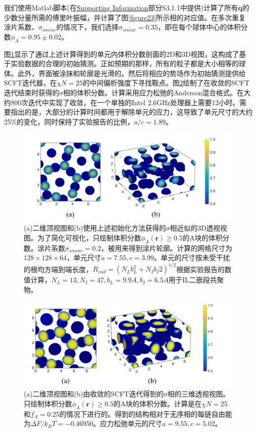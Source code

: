 \documentclass[12pt,a4paper]{article}
\begin{document}
我们使用Matlab脚本(在\href{http://pubs.acs.org/doi/suppl/10.1021/acs.macromol.6b00107/suppl_file/ma6b00107_si_001.pdf}{Supporting Information}部分S3.1.1中提供)计算了所有$\mathbf{q}$的少数分量所需的傅里叶振幅，并计算了图\ref{figure23}所示相的对应值。在多次重复涂片系数、$\sigma _{smear}$的情况下，我们选择$\sigma _{smear}=0.35$，即在每个球体中心的体积分数$\phi _A=0.95\pm0.02$。

图\ref{figure24}显示了通过上述计算得到的单元内体积分数剖面的2D和3D视图，这构成了基于实验数据的合理的初始猜测。正如预期的那样，所有的粒子都是大小相等的球体。此外，界面被涂抹和轮廓是光滑的。然后将相应的势场作为初始猜测提供给SCFT迭代器，在$\chi N=25$的中间偏析强度下寻找鞍点。图\ref{figure25}绘制了在收敛的SCFT迭代结束时获得的$\sigma$相的体积分数。计算采用应力松弛的Anderson混合格式。在大约800次迭代中实现了收敛，在一个单独的Intel 2.6GHz处理器上需要12小时。需要指出的是，大部分的计算时间都用于解除单元的应力，这导致了单元尺寸的大约25\%的变化，同时保持了实验报告的比例，$a/c=1.89$。
\begin{figure}[H]
	\centering
	\includegraphics[scale=0.5]{./figures/24.png}
	\caption{(a)二维顶视图和(b)使用上述初始化方法获得的$\sigma$相近似的3D透视视图。为了简化可视化，只绘制体积分数$\phi _A(\mathbf{r})\geq 0.5$的A块的体积分数。涂片系数$\sigma_{smear}=0.2$，被用来得到涂片轮廓。计算的网格尺寸为$128\times 128\times 64$，单元尺寸$a=7.55,c=3.99$。单元的尺寸按未受干扰的根均方端到端长度，$R_{end}=(N_L b_L^2 + N_I b_I 2)^{1/2}$根据实验报告的数值计算，$N_L=13,N_I=47,b_L=9.9A,b_I=6.5A$用于IL二嵌段共聚物。}
	\label{figure24}
\end{figure}

\begin{figure}[H]
	\centering
	\includegraphics[scale=0.5]{./figures/25.png}
	\caption{(a)二维顶视图和(b)由收敛的SCFT迭代得到的$\sigma$相的三维透视视图。只绘制体积分数$\phi _A(\mathbf{r})\geq 0.5$的A块的体积分数。计算是在$\chi N=25$和$f_A=0.25$的情况下进行的。得到的结构相对于无序相的每链自由能为$\Delta F/k_BT=-0.46950$。应力松弛单元的尺寸$a=9.55,c=5.02$。}
	\label{figure25}
\end{figure}
\end{document}
